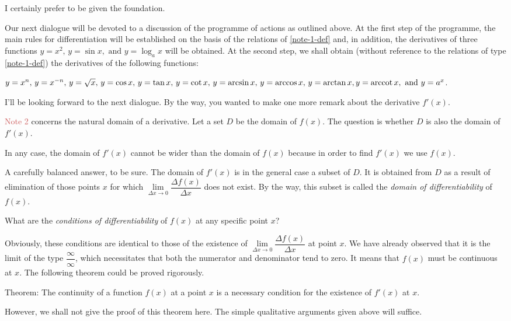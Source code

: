 \rdr I certainly prefer to be given the foundation.

\athr Our next dialogue will be devoted to a discussion of the programme of actions as outlined above. At the first step of the programme, the main rules for differentiation will be established on the basis of the relations of \eqref{note-1-def} and, in addition, the derivatives of three functions $y = x^{2}, \, y = \sin x, \, \, \text{and} \,\, y = \log_{a} x$ will be obtained. At the second step, we shall obtain (without reference to the relations of type \eqref{note-1-def}) the derivatives of the following functions: 

$y=x^{n}, \, y=x^{-n}, \, y= \sqrt{x}, \, y= \cos x, \, y= \tan x, \, y = \cot x, \, y = \arcsin x, \, y = \arccos x,\,  y= \arctan x, y = \operatorname{arccot} x, \,\, \text{and} \,\, y = a^{x}$.

\rdr I'll be looking forward to the next dialogue. By the way, you wanted to make one more remark about the derivative $f' (x)$.

\athr \textcolor{IndianRed}{Note 2} concerns the natural domain of a derivative. Let a set $D$ be the domain of $f (x)$. The question is whether $D$ is also the domain of $f' (x)$.

\rdr In any case, the domain of $f' (x)$ cannot be wider than the domain of $f (x)$ because in order to find $f' (x)$ we use $f (x)$.

\athr A carefully balanced answer, to be sure. The domain of $f' (x)$ is in the general case a subset of $D$. It is obtained from $D$ as a result of elimination of those points $x$ for which $\lim\limits_{\Delta x \to 0} \dfrac{\Delta f (x)}{\Delta x}$ does not exist. By the way, this subset is called the \emph{domain of differentiability} of $f (x)$. 

\rdr What are the \emph{conditions of differentiability} of $f(x)$ at any specific point $x$?

\athr Obviously, these conditions are identical to those of the existence of $\lim\limits_{\Delta x \to 0} \dfrac{\Delta f (x)}{\Delta x}$ at point $x$. We have
already observed that it is the limit of the type {\smaller $\dfrac{\infty}{\infty}$}, which necessitates that both the numerator and denominator tend to zero. It means that $f (x)$ must be continuous at $x$. The following theorem could be proved rigorously.

\begin{mytheo}{Theorem:}
The continuity of a function $f (x)$ at a point $x$ is a necessary condition for the existence of $f' (x)$ at $x$.
\end{mytheo}
However, we shall not give the proof of this theorem here. The simple qualitative arguments given above will suffice.


